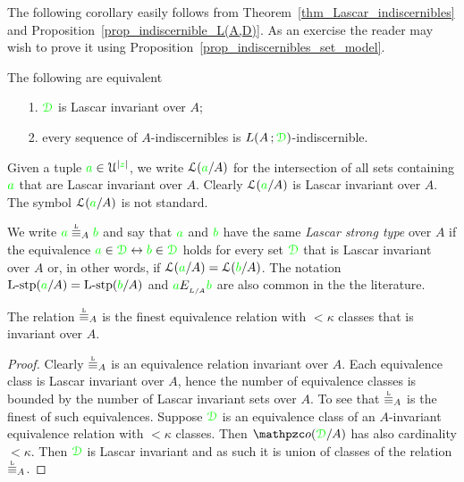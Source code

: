 \documentclass[creche.tex]{subfiles}
\begin{document}
The following corollary easily follows from Theorem~\ref{thm_Lascar_indiscernibles} and Proposition~\ref{prop_indiscernible_L(A,D)}. As an exercise the reader may wish to prove it using Proposition~\ref{prop_indiscernibles_set_model}.
 
\begin{corollary}
The following are equivalent
\begin{itemize}
\item[1.] ${\color{green}\EuScript D}$ is Lascar invariant over $A$;
\item[2.] every sequence of $A$-indiscernibles is $L(A\,;{\color{green}\EuScript D})$-indiscernible.\QED
\end{itemize}
\end{corollary}

\noindent\llap{\textcolor{red}{\Large\danger}
\kern1.5ex}Given a tuple ${\color{green} a}\in\EuScript U^{|{\color{green} z}|}$, we write \emph{$\EuScript L({\color{green} a}/A)$\/} for the intersection of all sets containing ${\color{green} a}$ that are Lascar invariant over $A$. Clearly $\EuScript L({\color{green} a}/A)$ is Lascar invariant over $A$. The symbol $\EuScript L({\color{green} a}/A)$ is not standard.

\begin{definition}\label{def_Lascar_type}We write \emph{${\gr a}\stackrel{\smash{\scalebox{.5}{\rm L}}}{\equiv}_A{\gr b}$\/} and say that ${\color{green} a}$ and ${\color{green} b}$ have the same \emph{Lascar strong type\/} over $A$ if the equivalence ${\color{green} a}\in{\color{green}\EuScript D}\leftrightarrow{\color{green}b}\in{\color{green}\EuScript D}$ holds for every set ${\color{green}\EuScript D}$ that is Lascar invariant over $A$ or, in other words, if $\EuScript L({\color{green} a}/A)=\EuScript L({\color{green} b}/A)$. The notation ${\rm L{\mbox{-}}stp}({\color{green} a}/A)={\rm L{\mbox{-}}stp}({\color{green} b}/A)$ and ${\color{green} a}E_{_{L/A}}{\color{green} b}$ are also common in the the literature.\QED
\end{definition}




\begin{proposition}
  The relation $\equivL_A$ is the finest equivalence relation with $<\kappa$ classes that is invariant over $A$.\QED
\end{proposition}

\begin{proof}
  Clearly $\equivL_A$ is an equivalence relation invariant over $A$. Each equivalence class is Lascar invariant over $A$, hence the number of equivalence classes is bounded by the number of Lascar invariant sets over $A$. To see that $\equivL_A$ is the finest of such equivalences. Suppose ${\color{green}\EuScript D}$ is an equivalence class of an $A$-invariant equivalence relation with $<\kappa$ classes. Then $\oorbit(\grD/A)$ has also cardinality $<\kappa$. Then ${\color{green}\EuScript D}$ is Lascar invariant and as such it is union of classes of the relation $\equivL_A$. 
\end{proof}
\end{document}
